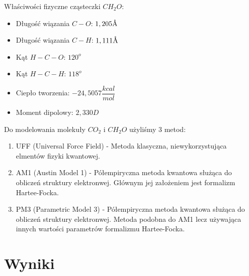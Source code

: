 \documentclass[a4paper,12pt]{extarticle}
\newcommand{\angstrom}{\mbox{\normalfont\AA}}
\begin{document}
  \noindent Właściwości fizyczne cząsteczki \( CH_2O \):
  \begin{itemize}
    \item{Długość wiązania \( C-O \): \( 1,205 \angstrom \)}
    \item{Długość wiązania \( C-H \): \( 1,111 \angstrom \)}
    \item{Kąt \( H-C-O \): \(120^o\)}
    \item{Kąt \( H-C-H \): \(118^o\)}
    \item{Ciepło tworzenia: \( -24,5057 \dfrac{kcal}{mol} \)}
    \item{Moment dipolowy: \( 2,330 D \)}
  \end{itemize}

  \noindent Do modelowania molekuły \( CO_2 \) i \( CH_2O \) użyliśmy 3 metod:
  \begin{enumerate}
    \item
    UFF (Universal Force Field) - Metoda klasyczna, niewykorzystująca elmentów fizyki kwantowej.
    
    \item
    AM1 (Austin Model  1) - Półempiryczna metoda kwantowa służąca do obliczeń struktury elektronwej.
    Głównym jej założeniem jest formalizm Hartee-Focka.
    
    \item
    PM3 (Parametric Model 3) - Półempiryczna metoda kwantowa służąca do obliczeń struktury elektronwej.
    Metoda podobna do AM1 lecz używająca innych wartości parametrów formalizmu Hartee-Focka.
  \end{enumerate}

  \clearpage
  \section{Wyniki}
\end{document}
